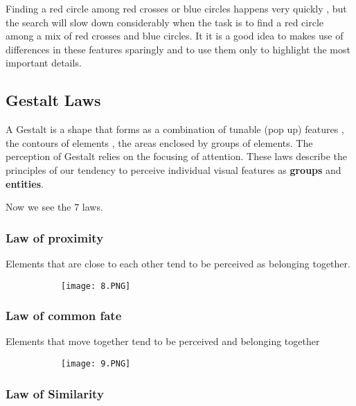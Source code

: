 \documentclass{article}
\begin{document}
Finding a red circle among red crosses or blue circles happens very quickly , but the search will slow down considerably when the task is to find a red circle among a mix of red crosses and blue circles.
It it is a good idea to makes use of differences in these features sparingly and to use them only to highlight the most important details.

\subsection{Gestalt Laws}

A Gestalt is a shape that forms as a combination of tunable (pop up) features , the contours of elements , the areas enclosed by groups of elements. The perception of Gestalt relies on the focusing of attention.
These laws describe the principles of our tendency to perceive individual visual features as \textbf{groups} and \textbf{entities}.

Now we see the 7 laws.

\subsubsection{Law of proximity}

Elements that are close to each other tend to be perceived as belonging together.

\begin{figure}[ht!]
  \centering
  \begin{subfigure}[b]{0.5\linewidth}
    \texttt{[image: 8.PNG]}
  \end{subfigure}
\end{figure}

\subsubsection{Law of common fate}

Elements that move together tend to be perceived and belonging together

\begin{figure}[ht!]
  \centering
  \begin{subfigure}[b]{0.5\linewidth}
    \texttt{[image: 9.PNG]}
  \end{subfigure}
\end{figure}

\subsubsection{Law of Similarity}
\end{document}
